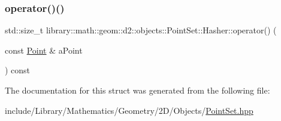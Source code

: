 \subsubsection{\texorpdfstring{operator()()}{operator()()}}
{\footnotesize\ttfamily std\+::size\+\_\+t library\+::math\+::geom\+::d2\+::objects\+::\+Point\+Set\+::\+Hasher\+::operator() (\begin{DoxyParamCaption}\item[{const \hyperlink{classlibrary_1_1math_1_1geom_1_1d2_1_1objects_1_1_point}{Point} \&}]{a\+Point }\end{DoxyParamCaption}) const\hspace{0.3cm}{\ttfamily [inline]}}



The documentation for this struct was generated from the following file\+:\begin{DoxyCompactItemize}
\item 
include/\+Library/\+Mathematics/\+Geometry/2\+D/\+Objects/\hyperlink{2_d_2_objects_2_point_set_8hpp}{Point\+Set.\+hpp}\end{DoxyCompactItemize}
